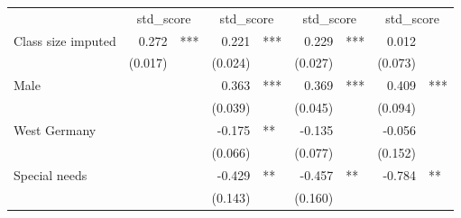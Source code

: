 \documentclass{article}
\begin{document}
\begin{table}[!h]
\centering
\begin{tabular}{lllllllll}
\cline{1-9}
\multicolumn{1}{r}{} &
  \multicolumn{2}{c}{std\_score} &
  \multicolumn{2}{c}{std\_score} &
  \multicolumn{2}{c}{std\_score} &
  \multicolumn{2}{c}{std\_score} \\
\cline{1-9}
\multicolumn{1}{l}{Class size imputed} &
  \multicolumn{1}{r}{0.272} &
  \multicolumn{1}{l}{***} &
  \multicolumn{1}{r}{0.221} &
  \multicolumn{1}{l}{***} &
  \multicolumn{1}{r}{0.229} &
  \multicolumn{1}{l}{***} &
  \multicolumn{1}{r}{0.012} &
  \multicolumn{1}{l}{} \\
\multicolumn{1}{l}{} &
  \multicolumn{1}{r}{(0.017)} &
  \multicolumn{1}{l}{} &
  \multicolumn{1}{r}{(0.024)} &
  \multicolumn{1}{l}{} &
  \multicolumn{1}{r}{(0.027)} &
  \multicolumn{1}{l}{} &
  \multicolumn{1}{r}{(0.073)} &
  \multicolumn{1}{l}{} \\
\multicolumn{1}{l}{Male} &
  \multicolumn{1}{r}{} &
  \multicolumn{1}{l}{} &
  \multicolumn{1}{r}{0.363} &
  \multicolumn{1}{l}{***} &
  \multicolumn{1}{r}{0.369} &
  \multicolumn{1}{l}{***} &
  \multicolumn{1}{r}{0.409} &
  \multicolumn{1}{l}{***} \\
\multicolumn{1}{l}{} &
  \multicolumn{1}{r}{} &
  \multicolumn{1}{l}{} &
  \multicolumn{1}{r}{(0.039)} &
  \multicolumn{1}{l}{} &
  \multicolumn{1}{r}{(0.045)} &
  \multicolumn{1}{l}{} &
  \multicolumn{1}{r}{(0.094)} &
  \multicolumn{1}{l}{} \\
\multicolumn{1}{l}{West Germany} &
  \multicolumn{1}{r}{} &
  \multicolumn{1}{l}{} &
  \multicolumn{1}{r}{-0.175} &
  \multicolumn{1}{l}{**} &
  \multicolumn{1}{r}{-0.135} &
  \multicolumn{1}{l}{} &
  \multicolumn{1}{r}{-0.056} &
  \multicolumn{1}{l}{} \\
\multicolumn{1}{l}{} &
  \multicolumn{1}{r}{} &
  \multicolumn{1}{l}{} &
  \multicolumn{1}{r}{(0.066)} &
  \multicolumn{1}{l}{} &
  \multicolumn{1}{r}{(0.077)} &
  \multicolumn{1}{l}{} &
  \multicolumn{1}{r}{(0.152)} &
  \multicolumn{1}{l}{} \\
\multicolumn{1}{l}{Special needs} &
  \multicolumn{1}{r}{} &
  \multicolumn{1}{l}{} &
  \multicolumn{1}{r}{-0.429} &
  \multicolumn{1}{l}{**} &
  \multicolumn{1}{r}{-0.457} &
  \multicolumn{1}{l}{**} &
  \multicolumn{1}{r}{-0.784} &
  \multicolumn{1}{l}{**} \\
\multicolumn{1}{l}{} &
  \multicolumn{1}{r}{} &
  \multicolumn{1}{l}{} &
  \multicolumn{1}{r}{(0.143)} &
  \multicolumn{1}{l}{} &
  \multicolumn{1}{r}{(0.160)} &
  \multicolumn{1}{l}{} &

\end{tabular}
\end{table}
\end{document}
